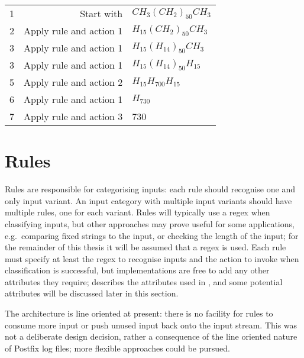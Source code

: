 \begin{tabular}{lrl}

    1 & Start with              & $CH_{3}{(CH_{2})}_{50}CH_{3}$ \\
    2 & Apply rule and action 1 & $H_{15}{(CH_{2})}_{50}CH_{3}$ \\
    3 & Apply rule and action 1 & $H_{15}{(H_{14})}_{50}CH_{3}$ \\
    3 & Apply rule and action 1 & $H_{15}{(H_{14})}_{50}H_{15}$ \\
    5 & Apply rule and action 2 & $H_{15}H_{700}H_{15}$ \\
    6 & Apply rule and action 1 & $H_{730}$ \\
    7 & Apply rule and action 3 & 730 \\

\end{tabular}

\section{Rules}

\label{rules in architecture}

Rules are responsible for categorising inputs: each rule should recognise
one and only input variant.  An input category with multiple input variants
should have multiple rules, one for each variant.  Rules will typically use
a regex when classifying inputs, but other approaches may prove useful for
some applications, e.g.\ comparing fixed strings to the input, or checking
the length of the input; for the remainder of this thesis it will be
assumed that a regex is used.  Each rule must specify at least the regex to
recognise inputs and the action to invoke when classification is
successful, but implementations are free to add any other attributes they
require;  describes the attributes used in
\parsername{}, and some potential attributes will be discussed later in
this section.

The architecture is line oriented at present: there is no facility for
rules to consume more input or push unused input back onto the input
stream.  This was not a deliberate design decision, rather a consequence of
the line oriented nature of Postfix log files; more flexible approaches
could be pursued.

